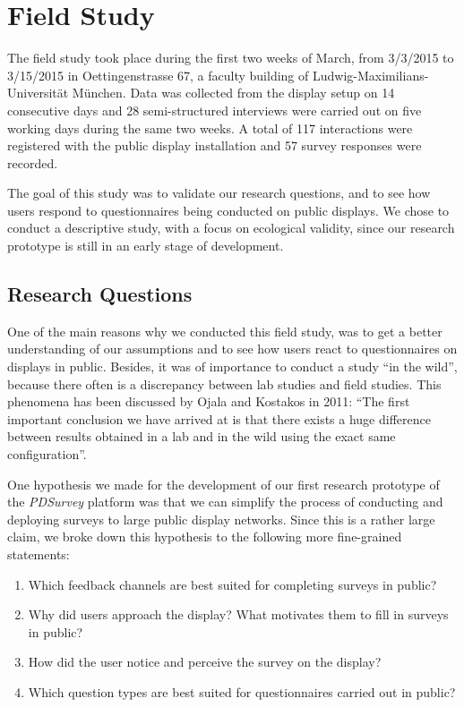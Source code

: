 \section{Field Study}
\label{chapter:field-study}


	The field study took place during the first two weeks of March, from 3/3/2015 to 3/15/2015 in Oettingenstrasse 67, a faculty building of Ludwig-Maximilians-Universit\"at M\"unchen. Data was collected from the display setup on 14 consecutive days and 28 semi-structured interviews were carried out on five working days during the same two weeks. A total of 117 interactions were registered with the public display installation and 57 survey responses were recorded.

	The goal of this study was to validate our research questions, and to see how users respond to questionnaires being conducted on public displays. We chose to conduct a descriptive study, with a focus on ecological validity, since our research prototype is still in an early stage of development. 




\subsection{Research Questions}

	One of the main reasons why we conducted this field study, was to get a better understanding of our assumptions and to see how users react to questionnaires on displays in public. Besides, it was of importance to conduct a study ``in the wild'', because there often is a discrepancy between lab studies and field studies. This phenomena has been discussed by Ojala and Kostakos in 2011: ``The first important conclusion we have arrived at is that there exists a huge difference between results obtained in a lab and in the wild using the exact same configuration''\cite{Ojala2011}.

	One hypothesis we made for the development of our first research prototype of the \textit{PDSurvey} platform was that we can simplify the process of conducting and deploying surveys to large public display networks. Since this is a rather large claim, we broke down this hypothesis to the following more fine-grained statements:

	\begin{enumerate}
		\item Which feedback channels are best suited for completing surveys in public?
		\item Why did users approach the display? What motivates them to fill in surveys in public? 
		\item How did the user notice and perceive the survey on the display?
		\item Which question types are best suited for questionnaires carried out in public? 
	\end{enumerate}

